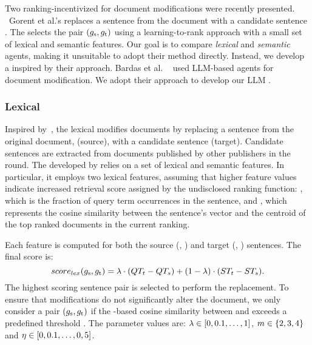 Two
ranking-incentivized \botagents for document modifications were recently presented.
~Gorent et al.'s \cite{Greg-bot} \botagent replaces a sentence \SrcSentence from the
document with a candidate sentence \TargetSentence. 
The \botagent selects the pair $(g_{\text{s}}, g_{\text{t}})$ using a learning-to-rank approach with a small set of lexical and semantic features. 
Our goal is to compare \textit{lexical} and \textit{semantic} agents, making it unsuitable to adopt their method directly.
Instead, we develop a \botagent inspired by their approach.
Bardas et al. ~\cite{Niv} used LLM-based agents for document modification. We adopt their approach to develop our LLM \botagent.


\subsubsection*{Lexical}

Inspired by~\citet{Greg-bot}, the lexical \botagent modifies documents
by replacing a sentence from the original document, \SrcSentence (source), with
a candidate sentence \TargetSentence (target).  Candidate sentences are
extracted from documents published by other publishers in the round.
The \botagent developed by \citet{Greg-bot} relies on a set of lexical and semantic features.  In particular, it employs two lexical
features, assuming that higher feature values indicate increased
retrieval score assigned by the undisclosed ranking function:
\firstmention{\QryTerm}, which is the fraction of query term occurrences in the sentence, and \firstmention{\SimTop}, which represents the cosine similarity between the sentence's \tfidf vector and the centroid of the top \numhighestranked ranked documents in the current ranking.

Each feature is computed for both the source (\QryTermSrc, \SimSrcTop) and target (\QryTermTarget, \SimTargetTop) sentences. The final score is:
\begin{equation*}
    score_{lex}(g_{\text{s}}, g_{\text{t}}) = \lambda \cdot (QT_{t} - QT_{s}) + (1-\lambda) \cdot (ST_{t}-ST_{s}).
\end{equation*}
The highest scoring sentence pair is selected to perform the replacement.
To ensure that modifications do not significantly alter
the document, we only consider a pair $(g_{\text{s}}, g_{\text{t}})$ if the \tfidf-based cosine similarity between \SrcSentence and \TargetSentence exceeds a predefined threshold \nlithreshold.
The parameter values are: $\lambda \in [0, 0.1, \ldots,1]$, $m \in \{2, 3, 4\}$ and $\eta \in [0,0.1,\ldots,0,5]$.

